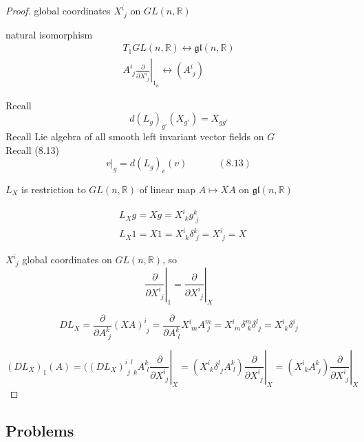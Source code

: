 \begin{proof}
global coordinates $X^i_{ \, \, j}$ on $GL(n,\mathbb{R})$

natural isomorphism
\[
\begin{gathered}
  T_1GL(n,\mathbb{R}) \longleftrightarrow \mathfrak{gl}(n,\mathbb{R}) \\
  A^i_{ \, \, j } \left. \frac{ \partial }{ \partial X^i_{ \, \, j }} \right|_{1_n} \longleftrightarrow (A^i_{ \, \, j})
\end{gathered}
\]


Recall 
\[
d(L_g)_{g'}(X_{g'}) = X_{gg'}
\]
Recall Lie algebra of all smooth left invariant vector fields on $G$ \\ 
Recall (8.13)
\begin{equation}
\left. v \right|_g = d(L_g)_e(v) \quad \quad \quad \, (8.13)
\end{equation}

$L_X$ is restriction to $GL(n,\mathbb{R})$ of linear map $A \mapsto XA$ on $\mathfrak{gl}{(n,\mathbb{R})}$  

\[
\begin{aligned}
  & L_X g = Xg = X^i_{ \, \, k } g^k_{ \, \, j } \\ 
  & L_X 1 = X1 = X^i_{ \, \, k } \delta^k_{ \, \, j } = X^i_{ \, \, j } = X
\end{aligned}
\]

$X^i_{ \, \, j}$ global coordinates on $GL(n,\mathbb{R})$, so
\[
\left. \frac{ \partial }{ \partial X^i_{\, \, j}} \right|_1 = \left. \frac{ \partial }{ \partial X^i_{\, \, j}} \right|_X
\]

\[
DL_X = \frac{ \partial}{ \partial A^k_{ \, \, j} } ( XA)^i_{ \, \, j} = \frac{ \partial }{ \partial A^k_{ \, \, l} } X^i_{ \, \, m} A^m_{ \, \, j} = X^i_{ \, \, m} \delta^m_{ \, \, k } \delta^l_{ \, \, j } = X^i_{ \, \, k } \delta^i_{ \, \, j}
\]

\[
(DL_X)_1(A) = ((DL_X)^{i \, \, \, l }_{ \, \, j \, \, \, k } A^k_{\, \, l} \left. \frac{ \partial }{ \partial X^i_{ \, \, j } } \right|_X = ( X^i_{ \, \, k } \delta^l_{ \, \, j} A^k_{ \, \, l } ) \left. \frac{ \partial }{ \partial X^i_{ \, \, j } }\right|_X = (X^i_{ \, \, k} A^k_{ \, \, j} ) \left. \frac{ \partial }{ \partial X^i_{ \, \, j} } \right|_X
\]


\end{proof}




\subsection*{Problems}

